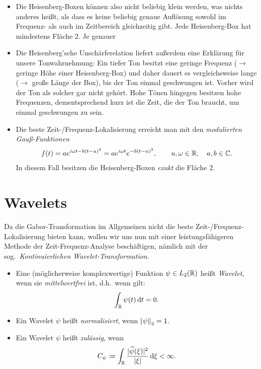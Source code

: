 \begin{remark} \leavevmode
\begin{itemize}
\item Die Heisenberg-Boxen können also nicht beliebig klein werden, was nichts anderes heißt, als
  dass es keine beliebig genaue Auflösung sowohl im Frequenz- als auch im Zeitbereich gleichzeitig
  gibt. Jede Heisenberg-Box hat mindestens Fläche $ 2 $. Je genauer
\item Die Heisenberg'sche Unschärferelation liefert außerdem eine Erklärung für unsere 
  Tonwahrnehmung: Ein tiefer Ton besitzt eine geringe Frequenz ($ \rightarrow $ geringe Höhe 
  einer Heisenberg-Box) und daher dauert es vergleichsweise lange ($ \rightarrow $ große Länge der 
  Box), bis der Ton einmal geschwungen ist. Vorher wird der Ton als solcher gar nicht gehört.
  Hohe Tönen hingegen besitzen hohe Frequenzen, dementsprechend kurz ist die Zeit, die der Ton
  braucht, um einmal geschwungen zu sein.
\item Die beste Zeit-/Frequenz-Lokalisierung erreicht man mit den \emph{modulierten Gauß-Funktionen}
  \[
    f(t) = a e^{i \omega t - b(t-u)^{2}} = a e^{i \omega t} e^{-b(t-u)^{2}},
      \qquad u, \omega \in \mathbb{R}, \quad a,b \in \mathbb{C}.
  \]
  In diesem Fall besitzen die Heisenberg-Boxen \emph{exakt} die Fläche $ 2 $.
\end{itemize}
\end{remark}


\section{Wavelets}

Da die Gabor-Transformation im Allgemeinen nicht die beste Zeit-/Frequenz-Lokalisierung bieten kann,
wollen wir uns nun mit einer leistungsfähigeren Methode der Zeit-Frequenz-Analyse beschäftigen,
nämlich mit der sog.\ \emph{Kontinuierlichen Wavelet-Transformation}.

\begin{definition} \leavevmode
\begin{itemize}
\item Eine (möglicherweise komplexwertige) Funktion $ \psi \in L_{2}(\mathbb{R}) $ heißt \emph{Wavelet},
  wenn sie \emph{mittelwertfrei} ist, d.h.\ wenn gilt:
  \[
    \int_{\R} \psi(t) \dif t = 0.
  \]
\item Ein Wavelet $ \psi $ heißt \emph{normalisiert}, wenn $ \norm{\psi}_{2} = 1 $.
\item Ein Wavelet $ \psi $ heißt \emph{zulässig}, wenn
  \[
    C_{\psi} \coloneqq \int_{\R} \frac{|\widehat{\psi}(\xi)|^{2}}{|\xi|} \dif \xi < \infty.
  \]
\end{itemize}
\end{definition}

